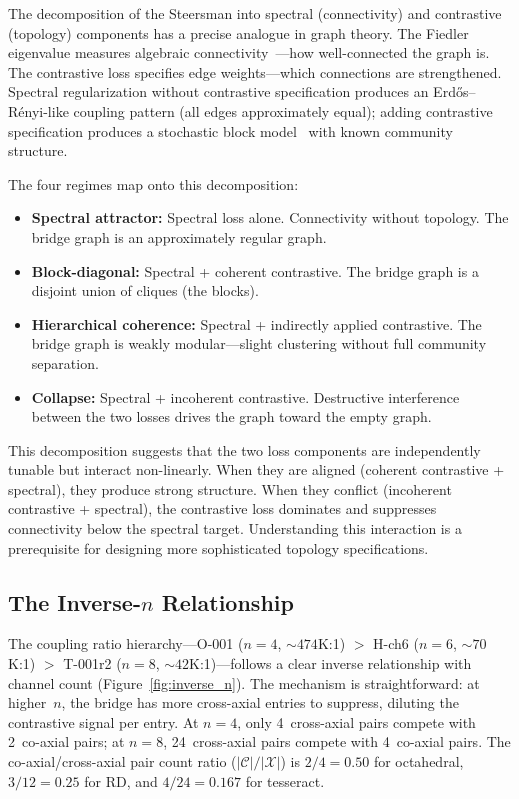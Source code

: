 The decomposition of the Steersman into spectral (connectivity) and
contrastive (topology) components has a precise analogue in graph
theory. The Fiedler eigenvalue measures algebraic
connectivity~\cite{fiedler1973}---how well-connected the graph is.
The contrastive loss specifies edge weights---which connections are
strengthened. Spectral regularization without contrastive
specification produces an Erd\H{o}s--R\'enyi-like coupling
pattern (all edges approximately equal); adding contrastive
specification produces a stochastic block model~\cite{holland1983}
with known community structure.

The four regimes map onto this decomposition:

\begin{itemize}
  \item \textbf{Spectral attractor:} Spectral loss alone. Connectivity
    without topology. The bridge graph is an approximately regular graph.
  \item \textbf{Block-diagonal:} Spectral + coherent contrastive. The
    bridge graph is a disjoint union of cliques (the blocks).
  \item \textbf{Hierarchical coherence:} Spectral + indirectly applied
    contrastive. The bridge graph is weakly modular---slight clustering
    without full community separation.
  \item \textbf{Collapse:} Spectral + incoherent contrastive.
    Destructive interference between the two losses drives the graph
    toward the empty graph.
\end{itemize}

This decomposition suggests that the two loss components are
independently tunable but interact non-linearly. When they are
aligned (coherent contrastive + spectral), they produce strong
structure. When they conflict (incoherent contrastive + spectral),
the contrastive loss dominates and suppresses connectivity below the
spectral target. Understanding this interaction is a prerequisite
for designing more sophisticated topology specifications.

\subsection{The Inverse-$n$ Relationship}

The coupling ratio hierarchy---O-001 ($n = 4$, ${\sim}474$K:1) $>$
H-ch6 ($n = 6$, ${\sim}70$K:1) $>$ T-001r2 ($n = 8$,
${\sim}42$K:1)---follows a clear inverse relationship with channel
count (Figure~\ref{fig:inverse_n}). The mechanism is straightforward:
at higher~$n$, the bridge
has more cross-axial entries to suppress, diluting the contrastive
signal per entry. At $n = 4$, only 4~cross-axial pairs compete
with 2~co-axial pairs; at $n = 8$, 24~cross-axial pairs compete
with 4~co-axial pairs. The co-axial/cross-axial pair count ratio
($|\mathcal{C}|/|\mathcal{X}|$) is $2/4 = 0.50$ for octahedral,
$3/12 = 0.25$ for RD, and $4/24 = 0.167$ for tesseract.

